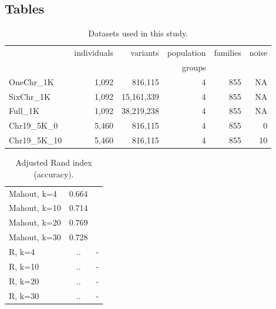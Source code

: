 \documentclass[twocolumn]{bmcart}%
\newcommand{\OneReal}{OneChr\_1K}
\newcommand{\SixReal}{SixChr\_1K}
\newcommand{\FullReal}{Full\_1K}
\newcommand{\SixArtiExact}{Chr19\_5K\_0}
\newcommand{\SixArtiNoise}{Chr19\_5K\_10}
\begin{document}
\begin{backmatter}

\section*{Tables}
\begin{table}[h!]
\caption{Datasets used in this study.}
      \begin{tabular}{lrrrrr}
        \hline
           & individuals  & variants  & population & families & noise\\ 
           & & &groups&& \\ \hline
        \OneReal & 1,092 & 816,115  & 4 & 855 & NA\\
        \SixReal & 1,092 & 15,161,339 & 4 & 855 & NA\\
        \FullReal\ & 1,092 & 38,219,238 & 4 & 855 & NA\\
	\SixArtiExact\ & 5,460 & 816,115 & 4 & 855 & 0 \\ 
	\SixArtiNoise\ & 5,460 & 816,115 & 4 & 855 & 10 \\ 
      \end{tabular}
      \label{datasets}
\end{table}


\begin{table}[h!]
\caption{Adjusted Rand index (accuracy).}
      \begin{tabular}{lcc}
        \hline
        Mahout, k=4 & 0.664\\
        Mahout, k=10 & 0.714 \\
        Mahout, k=20 & 0.769 \\ 
        Mahout, k=30 & 0.728  \\ 
        R, k=4 & .. & - \\
        R, k=10 & .. & - \\
        R, k=20 & .. & - \\ 
        R, k=30 & .. & - \\ \hline
      \end{tabular}
      \label{datasetsAcc}
\end{table}


\end{backmatter}
\end{document}
